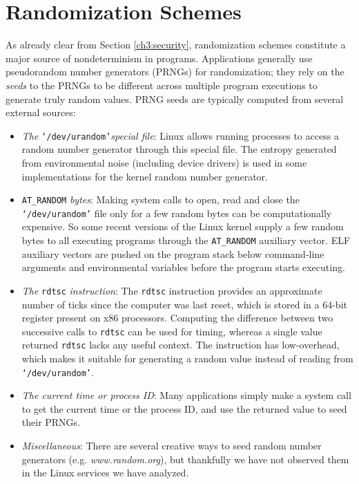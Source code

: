 \section{Randomization Schemes} \label{ch3:rand}
As already clear from Section \ref{ch3:security}, 
randomization schemes constitute a major source of nondeterminism 
in programs.
Applications generally use pseudorandom number generators (PRNGs)
for randomization; they rely on the {\em seeds} to the PRNGs
to be different across multiple program executions 
to generate truly random values. PRNG seeds are typically 
computed from several external sources:

\begin{itemize}

\item {\em The} \texttt{`/dev/urandom'}{\em special file}: Linux allows
running processes to access a random number generator through this special file. The entropy generated
from environmental noise (including device drivers)
is used in some implementations for the kernel random number generator.
\item \texttt{AT\_RANDOM} {\em bytes}: 
Making system calls to open, read and close the
\texttt{`/dev/urandom'} file only for a
few random bytes can be computationally expensive. So 
some recent versions of the Linux kernel supply
a few random bytes to all executing programs
through the \texttt{AT\_RANDOM} auxiliary vector.
ELF auxiliary vectors are pushed on the program
stack below command-line arguments and environmental
variables before the program starts executing.

\item {\em The} \texttt{rdtsc} {\em instruction}:
The \texttt{rdtsc} instruction provides an approximate number of ticks since
the computer was last reset, which is stored in a 64-bit register present
on x86 processors. Computing the difference between two successive
calls to \texttt{rdtsc} can be used for timing, whereas a single
value returned \texttt{rdtsc} lacks any useful context.  
The instruction has low-overhead, which makes it suitable for generating a random value
instead of reading from \texttt{`/dev/urandom'}. 

\item {\em The current time or process ID}: Many applications simply make a system call
to get the current time or the process ID, and use the returned value to seed their PRNGs. 

\item {\em Miscellaneous}: There
are several creative ways to seed random number
generators (e.g. {\em www.random.org}),
but thankfully we have not observed them
in the Linux services we have analyzed.
      
\end{itemize}


